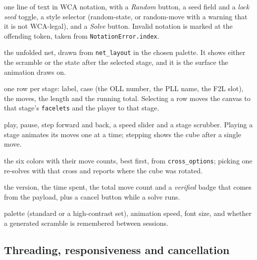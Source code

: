 \begin{description}[leftmargin=0em,style=nextline]
  \item[Scramble bar] one line of text in WCA notation, with a \emph{Random}
  button, a seed field and a \emph{lock seed} toggle, a style selector
  (random-state, or random-move with a warning that it is not WCA-legal), and a
  \emph{Solve} button.  Invalid notation is marked at the offending token, taken
  from \texttt{NotationError.index}.
  \item[Cube canvas] the unfolded net, drawn from \texttt{net\_layout} in the chosen
  palette.  It shows either the scramble or the state after the selected stage, and
  it is the surface the animation draws on.
  \item[Solution table] one row per stage: label, case (the OLL number, the PLL name,
  the F2L slot), the moves, the length and the running total.  Selecting a row moves
  the canvas to that stage's \texttt{facelets} and the player to that stage.
  \item[Player] play, pause, step forward and back, a speed slider and a stage
  scrubber.  Playing a stage animates its moves one at a time; stepping shows the
  cube after a single move.
  \item[Cross picker] the six colors with their move counts, best first, from
  \texttt{cross\_options}; picking one re-solves with that cross and reports where
  the cube was rotated.
  \item[Status bar] the version, the time spent, the total move count and a
  \emph{verified} badge that comes from the payload, plus a cancel button while a
  solve runs.
  \item[Settings] palette (standard or a high-contrast set), animation speed, font
  size, and whether a generated scramble is remembered between sessions.
\end{description}

\subsection{Threading, responsiveness and cancellation}

